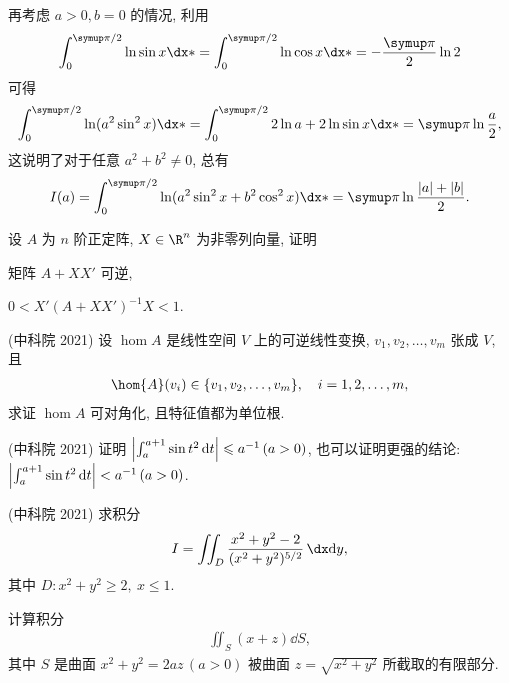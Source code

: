 \begin{exercise}[resume=exer]
\begin{answer}
          再考虑 $ a > 0, b = 0 $ 的情况, 利用
          \begin{align*}
              \int_{0}^{\pi/2} \ln\sin x\dx* = \int_{0}^{\pi/2} \ln\cos x\dx* = -\frac{\pi}{2} \ln 2
          \end{align*}
          可得
          \begin{align*}
              \int_{0}^{\pi/2} \ln(a^{2}\sin^{2}x) \dx* = \int_{0}^{\pi/2} 2\ln a + 2\ln \sin x\dx* = \pi\ln\frac{a}{2},
          \end{align*}
          这说明了对于任意 $ a^{2} + b^{2} \ne 0 $, 总有
          \begin{align*}
              I(a) = \int_{0}^{\pi/2} \ln (a^{2}\sin^{2}x + b^{2}\cos^{2}x) \dx* = \pi\ln\frac{\abs{a} + \abs{b}}{2}.
          \end{align*}
      \end{answer}
      \item 设 $ A $ 为 $ n $ 阶正定阵, $ X \in \R^{n} $ 为非零列向量, 证明
      \begin{exercise}
          \item 矩阵 $ A + XX' $ 可逆,
          \item $ 0 < X'(A + XX')^{-1}X < 1 $.
      \end{exercise}
      \item (中科院 2021) 设 $ \hom{A} $ 是线性空间 $ V $ 上的可逆线性变换, $ v_{1}, v_{2}, \dots, v_{m} $ 张成 $ V $, 且
      \begin{align*}
          \hom{A}(v_{i}) \in \set{v_{1}, v_{2}, \dots, v_{m}}, \quad i = 1, 2, \dots, m,
      \end{align*}
      求证 $ \hom{A} $ 可对角化, 且特征值都为单位根.
      \item (中科院 2021) 证明 $ \abs{\int_{a}^{a + 1} \sin t^{2} \dd{t}} \leqslant a^{-1}\,(a > 0) $, 也可以证明更强的结论: $ \abs{\int_{a}^{a + 1} \sin t^{2} \dd{t}} < a^{-1}\,(a > 0) $.
      \item (中科院 2021) 求积分
      \begin{align*}
          I = \iint_{D} \frac{x^{2} + y^{2} - 2}{(x^{2} + y^{2})^{5/2}}\,\dx\dd y,
      \end{align*}
      其中 $ D: x^{2} + y^{2} \ge 2,\ x \le 1 $.
      \item 计算积分
      \begin{align*}
          \iint_{S} (x + z) \dd{S},
      \end{align*}
      其中 $ S $ 是曲面 $ x^{2} + y^{2} = 2az\,(a > 0) $ 被曲面 $ z = \sqrt{x^{2} + y^{2}} $ 所截取的有限部分.

\end{exercise}
